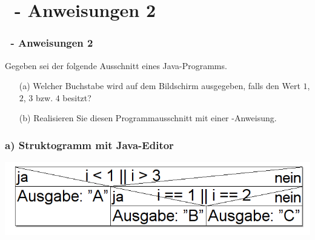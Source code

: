 \def\stitle{\theexercise\ - Anweisungen 2}
\section{\stitle}
\begin{frame}[t]%
    \frametitle{\stitle}
\medskip

Gegeben sei der folgende Ausschnitt eines Java-Programms.


\begin{itemize}
\item[(a)] Welcher Buchstabe wird auf dem Bildschirm ausgegeben, falls  den Wert $1$, $2$, $3$ bzw. $4$ besitzt?
\item[(b)] Realisieren Sie diesen Programmausschnitt mit einer -Anweisung.
\end{itemize}
\end{frame}


\begin{frame}[fragile]%
 \frametitle{a) Struktogramm mit Java-Editor}%

\begin{center}

\includegraphics[width=1\textwidth]{anweis-2/Bilder/Struktogramm_a}
\end{center}
\end{frame}


